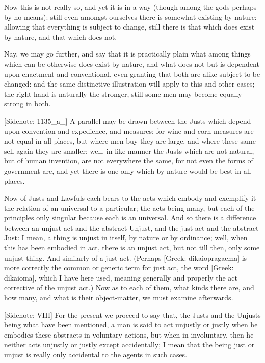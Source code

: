 Now this is not really so, and yet it is in a way (though among the gods
perhaps by no means): still even amongst ourselves there is somewhat
existing by nature: allowing that everything is subject to change, still
there is that which does exist by nature, and that which does not.

Nay, we may go further, and say that it is practically plain what among
things which can be otherwise does exist by nature, and what does not
but is dependent upon enactment and conventional, even granting
that both are alike subject to be changed: and the same distinctive
illustration will apply to this and other cases; the right hand is
naturally the stronger, still some men may become equally strong in
both.

[Sidenote: 1135_a_] A parallel may be drawn between the Justs which
depend upon convention and expedience, and measures; for wine and corn
measures are not equal in all places, but where men buy they are large,
and where these same sell again they are smaller: well, in like manner
the Justs which are not natural, but of human invention, are not
everywhere the same, for not even the forms of government are, and yet
there is one only which by nature would be best in all places.

Now of Justs and Lawfuls each bears to the acts which embody and
exemplify it the relation of an universal to a particular; the acts
being many, but each of the principles only singular because each is an
universal. And so there is a difference between an unjust act and the
abstract Unjust, and the just act and the abstract Just: I mean, a thing
is unjust in itself, by nature or by ordinance; well, when this has been
embodied in act, there is an unjust act, but not till then, only
some unjust thing. And similarly of a just act. (Perhaps [Greek:
dikaiopragaema] is more correctly the common or generic term for just
act, the word [Greek: dikaioma], which I have here used, meaning
generally and properly the act corrective of the unjust act.) Now as
to each of them, what kinds there are, and how many, and what is their
object-matter, we must examine afterwards.

[Sidenote: VIII] For the present we proceed to say that, the Justs
and the Unjusts being what have been mentioned, a man is said to act
unjustly or justly when he embodies these abstracts in voluntary
actions, but when in involuntary, then he neither acts unjustly or
justly except accidentally; I mean that the being just or unjust is
really only accidental to the agents in such cases.

